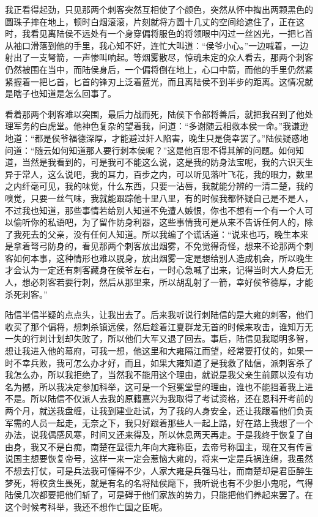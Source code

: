 我正看得起劲，只见那两个刺客突然互相使了个颜色，突然从怀中掏出两颗黑色的圆珠子摔在地上，顿时白烟滚滚，片刻就将方圆十几丈的空间给遮住了，正在这时，我看见离陆侯不远处有一个身穿偏将服色的将领眼中闪过一丝凶光，一把匕首从袖口滑落到他的手里，我心知不好，连忙大叫道：“侯爷小心。”一边喊着，一边射出了一支弩箭，一声惨叫响起。等烟雾散尽，惊魂未定的众人看去，那两个刺客仍然被围在当中，而陆侯身后，一个偏将倒在地上，心口中箭，而他的手里仍然紧紧握着一把匕首，匕首的锋刃上泛着蓝光，而且离陆侯不到半步的距离。这情况就是瞎子也知道是怎么回事了。

看着那两个刺客难以突围，最后力战而死，陆侯下令部将善后，就把我召到了他处理军务的白虎堂。他神色复杂的望着我，问道：“多谢随云相救本侯一命。”我谦逊地道：“都是侯爷福德深厚，才能避过奸人陷害，晚生只是侥幸罢了。”陆侯疑惑地问道：“随云如何知道那人要行刺本侯呢？”这是他百思不得其解的问题。如何知道，当然是我看到的，可是我可不能这么说，这是我的防身法宝呢，我的六识天生异于常人，这么说吧，我的耳力，百步之内，可以听见落叶飞花，我的眼力，数里之内纤毫可见，我的味觉，什么东西，只要一沾唇，我就能分辨的一清二楚，我的嗅觉，只要一丝气味，我就能跟踪他十里八里，有的时候我都怀疑自己是不是人，不过我也知道，那些事情若给别人知道不免遭人嫉恨，你也不想有一个有一个人可以偷听你的私语吧，为了留作防身利器，这些事情我可是从来不告诉任何人的，除了我死去的父亲，没有任何人知道。所以我编了个谎话道：“说来也巧，晚生本来是拿着弩弓防身的，看见那两个刺客放出烟雾，不免觉得奇怪，想来不论那两个刺客如何本事，这种情形也难以脱身，放出烟雾一定是想给别人造成机会，所以晚生才会认为一定还有刺客藏身在侯爷左右，一时心急喊了出来，记得当时大人身后无人，想必刺客若要行刺，然后从那里来，所以胡乱射了一箭，幸好侯爷德厚，才能杀死刺客。”

陆信半信半疑的点点头，让我出去了。后来我听说行刺陆信的是大雍的刺客，他们收买了那个偏将，想刺杀镇远侯，然后趁着江夏群龙无首的时候来攻击，谁知万无一失的行刺计划却失败了，所以他们大军又退了回去。事后，陆信见我聪明多智，想让我进入他的幕府，可我一想，他这里和大雍隔江而望，经常要打仗的，如果一时不幸兵败，我可怎么办才好，而且，如果大雍知道了是我救了陆信，派刺客杀了我怎么办，所以我拒绝了，当然我不能用这个理由，就说是我父亲生前颇以没有功名为撼，所以我决定参加科举，这可是一个冠冕堂皇的理由，谁也不能挡着我上进不是。所以陆信不仅派人去我的原籍嘉兴为我取得了考试资格，还在恩科开考前的两个月，就送我盘缠，让我到建业赴试，为了我的人身安全，还让我跟着他们负责军需的人员一起走，无奈之下，我只好跟着那些人一起上路，好在路上我想了一个办法，说我偶感风寒，时间又还来得及，所以休息两天再走。于是我终于恢复了自由身，我又不是白痴，南楚在显德九年向大雍称臣，去帝号称国主，现在又有传言说国主想要恢复帝号，这样一来一定会惹恼大雍的，将来一定是兵祸连绵，我虽然不想去打仗，可是兵法我可懂得不少，人家大雍是兵强马壮，而南楚却是君臣醉生梦死，将校贪生畏死，就是有名的名将陆侯麾下，我听说也有不少胆小鬼呢，气得陆侯几次都要把他们斩了，可是碍于他们家族的势力，只能把他们养起来罢了。在这个时候考科举，我还不想作亡国之臣呢。

